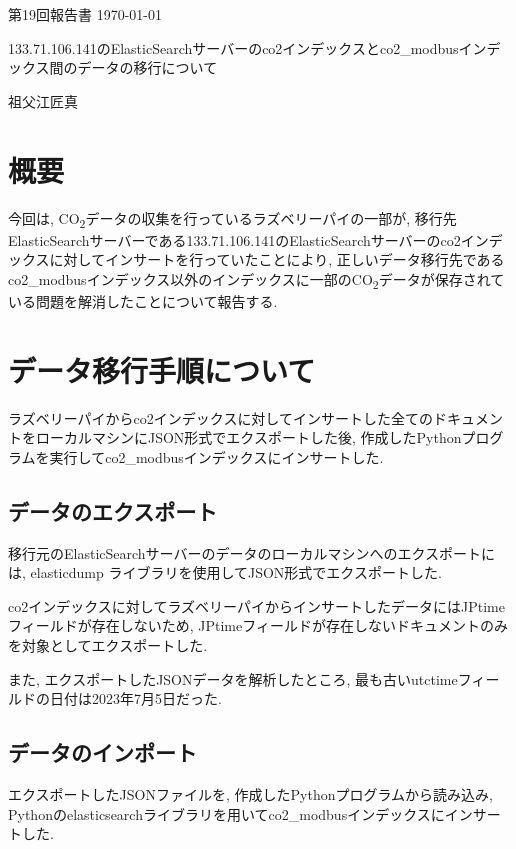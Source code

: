 \documentclass[a4j,12pt,]{jarticle}
\begin{document}
{\noindent\small 第19回報告書 \hfill\today}
\begin{center}
  {\Large 133.71.106.141のElasticSearchサーバーのco2インデックスとco2\_modbusインデックス間のデータの移行について}
\end{center}
\begin{flushright}
  祖父江匠真 \\
\end{flushright}

\section{概要}
今回は, CO\textsubscript{2}データの収集を行っているラズベリーパイの一部が, 移行先ElasticSearchサーバーである133.71.106.141のElasticSearchサーバーのco2インデックスに対してインサートを行っていたことにより, 正しいデータ移行先であるco2\_modbusインデックス以外のインデックスに一部のCO\textsubscript{2}データが保存されている問題を解消したことについて報告する.

\section{データ移行手順について}

ラズベリーパイからco2インデックスに対してインサートした全てのドキュメントをローカルマシンにJSON形式でエクスポートした後, 作成したPythonプログラムを実行してco2\_modbusインデックスにインサートした.

\subsection{データのエクスポート}
移行元のElasticSearchサーバーのデータのローカルマシンへのエクスポートには, elasticdump \cite{1}ライブラリを使用してJSON形式でエクスポートした.

co2インデックスに対してラズベリーパイからインサートしたデータにはJPtimeフィールドが存在しないため, JPtimeフィールドが存在しないドキュメントのみを対象としてエクスポートした.

また, エクスポートしたJSONデータを解析したところ, 最も古いutctimeフィールドの日付は2023年7月5日だった.

\subsection{データのインポート}
エクスポートしたJSONファイルを, 作成したPythonプログラムから読み込み, Pythonのelasticsearchライブラリを用いてco2\_modbusインデックスにインサートした.
\end{document}
